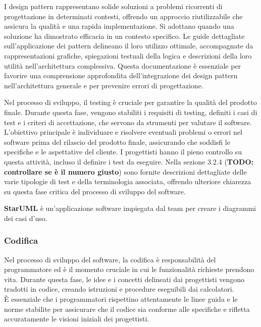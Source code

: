 I design pattern rappresentano solide soluzioni a problemi ricorrenti di progettazione in determinati contesti, offrendo un approccio riutilizzabile che assicura la qualità e una rapida implementazione. Si adottano quando una soluzione ha dimostrato efficacia in un contesto specifico. Le guide dettagliate sull'applicazione dei pattern delineano il loro utilizzo ottimale, accompagnate da rappresentazioni grafiche, spiegazioni testuali della logica e descrizioni della loro utilità nell'architettura complessiva. Questa documentazione è essenziale per favorire una comprensione approfondita dell'integrazione dei design pattern nell'architettura generale e per prevenire errori di progettazione.

Nel processo di sviluppo, il testing è cruciale per garantire la qualità del prodotto finale. Durante questa fase, vengono stabiliti i requisiti di testing, definiti i casi di test e i criteri di accettazione, che servono da strumenti per valutare il software.\\ L'obiettivo principale è individuare e risolvere eventuali problemi o errori nel software prima del rilascio del prodotto finale, assicurando che soddisfi le specifiche e le aspettative del cliente. I progettisti hanno il pieno controllo su questa attività, incluso il definire i test da eseguire. Nella sezione 3.2.4 (\textbf{TODO: controllare se è il numero giusto}) sono fornite descrizioni dettagliate delle varie tipologie di test e della terminologia associata, offrendo ulteriore chiarezza su questa fase critica del processo di sviluppo del software.


\textbf{StarUML} è un'applicazione software impiegata dal team per creare i diagrammi dei casi d'uso.

\subsubsection{Codifica}
Nel processo di sviluppo del software, la codifica è responsabilità del programmatore ed è il momento cruciale in cui le funzionalità richieste prendono vita. Durante questa fase, le idee e i concetti delineati dai progettisti vengono tradotti in codice, creando istruzioni e procedure eseguibili dai calcolatori.\\ È essenziale che i programmatori rispettino attentamente le linee guida e le norme stabilite per assicurare che il codice sia conforme alle specifiche e rifletta accuratamente le visioni iniziali dei progettisti.

